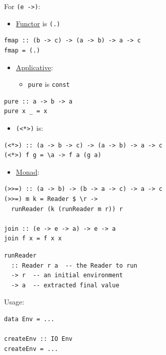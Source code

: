 \documentclass[a4paper,14pt,oneside]{book}
\begin{document}
{For \texttt{(e ->)}:\\
\begin{itemize}
\item \hyperref[orgba8e41d]{Functor} is \texttt{(.)}\\
\end{itemize}
\begin{verbatim}
fmap :: (b -> c) -> (a -> b) -> a -> c
fmap = (.)
\end{verbatim}
\begin{itemize}
\item \hyperref[org812e4b8]{Applicative}:\\
\begin{itemize}
\item \texttt{pure} is \texttt{const}\\
\end{itemize}
\end{itemize}
\begin{verbatim}
pure :: a -> b -> a
pure x _ = x
\end{verbatim}
\begin{itemize}
\item \texttt{(<*>)} is:\\
\end{itemize}
\begin{verbatim}
(<*>) :: (a -> b -> c) -> (a -> b) -> a -> c
(<*>) f g = \a -> f a (g a)
\end{verbatim}

\begin{itemize}
\item \hyperref[org90c21ab]{Monad}:\\
\end{itemize}
\begin{verbatim}
(>>=) :: (a -> b) -> (b -> a -> c) -> a -> c
(>>=) m k = Reader $ \r ->
  runReader (k (runReader m r)) r

join :: (e -> e -> a) -> e -> a
join f x = f x x
\end{verbatim}

\begin{verbatim}
runReader
  :: Reader r a  -- the Reader to run
  -> r  -- an initial environment
  -> a  -- extracted final value
\end{verbatim}

Usage:\\
\begin{verbatim}
data Env = ...

createEnv :: IO Env
createEnv = ...


\end{verbatim}}
\end{document}
